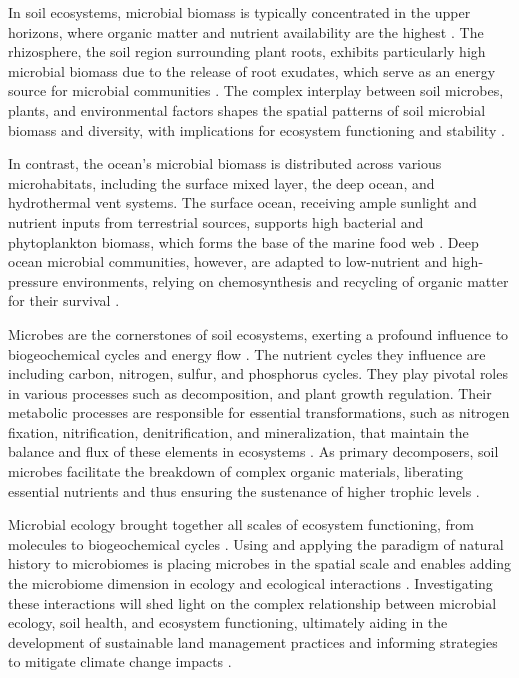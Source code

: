 In soil ecosystems, microbial biomass is typically concentrated in the upper
horizons, where organic matter and nutrient availability are the highest \parencite{Anthony2023}.
The rhizosphere, the soil region surrounding plant roots, exhibits particularly
high microbial biomass due to the release of root exudates, which serve as an
energy source for microbial communities \parencite{beugnon2022Abiotic}. The complex
interplay between soil microbes, plants, and environmental factors shapes the
spatial patterns of soil microbial biomass and diversity, with implications for
ecosystem functioning and stability \parencite{philippot2024the-interplay}.

In contrast, the ocean's microbial biomass is distributed across various
microhabitats, including the surface mixed layer, the deep ocean, and hydrothermal
vent systems. The surface ocean, receiving ample sunlight and nutrient inputs
from terrestrial sources, supports high bacterial and phytoplankton biomass,
which forms the base of the marine food web \parencite{Sunagawa2015}. Deep ocean
microbial communities, however, are adapted to low-nutrient and high-pressure
environments, relying on chemosynthesis and recycling of organic matter for their survival \parencite{christakis2018microbial}.

Microbes are the cornerstones of soil ecosystems, exerting a profound influence
to biogeochemical cycles and energy flow \parencite{graham2016Microbes}. The nutrient cycles they influence are
including carbon, nitrogen, sulfur, and phosphorus cycles.
They play pivotal roles in various processes such as decomposition,
and plant growth regulation.
Their metabolic processes are responsible for essential transformations, such as
nitrogen fixation, nitrification, denitrification, and mineralization, that
maintain the balance and flux of these elements in ecosystems \parencite{martiny2023Investigating}.
As primary decomposers, soil microbes facilitate the breakdown of complex
organic materials, liberating essential nutrients and thus ensuring the
sustenance of higher trophic levels \parencite{GRANDY201640}.

Microbial ecology brought together all scales of ecosystem functioning, from
molecules to biogeochemical cycles \parencite{hall2018understanding,kempes2012Growth,raes2011molecular}.
Using and applying the paradigm of natural history to microbiomes \parencite{Fierer2006} is placing microbes
in the spatial scale and enables adding the microbiome dimension in ecology and ecological interactions \parencite{Martiny2006}.
Investigating these
interactions will shed light on the complex relationship between microbial
ecology, soil health, and ecosystem functioning, ultimately aiding in the
development of sustainable land management practices and informing strategies to mitigate climate change impacts \parencite{cavicchioli2019scientists}.


